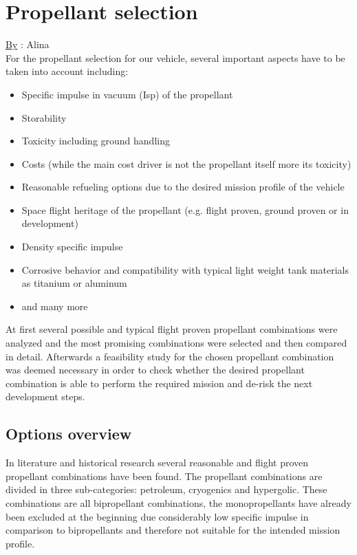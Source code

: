 \chapter{Propellant selection}
\qquad \underline{By} : Alina\\

For the propellant selection for our vehicle, several important aspects have to be taken into account including:
\begin{itemize}
	\itemsep0em
	\item 	Specific impulse in vacuum (Isp) of the propellant
	\item	Storability
	\item	Toxicity including ground handling
	\item	Costs (while the main cost driver is not the propellant itself more its toxicity)
	\item	Reasonable refueling options due to the desired mission profile of the vehicle
	\item	Space flight heritage of the propellant (e.g. flight proven, ground proven or in development)
	\item	Density specific impulse
	\item	Corrosive behavior and compatibility with typical light weight tank materials as titanium or aluminum
	\item	and many more
\end{itemize}

At first several possible and typical flight proven propellant combinations were analyzed and the most promising combinations were selected and then compared in detail. Afterwards a feasibility study for the chosen propellant combination was deemed necessary in order to check whether the desired propellant combination is able to perform the required mission and de-risk the next development steps.
\clearpage
\section{Options overview}
\qquad In literature and historical research several reasonable and flight proven propellant combinations have been found. The propellant combinations are divided in three sub-categories: petroleum, cryogenics and hypergolic. These combinations are all bipropellant combinations, the monopropellants have already been excluded at the beginning due considerably low specific impulse in comparison to bipropellants and therefore not suitable for the intended mission profile.\\

